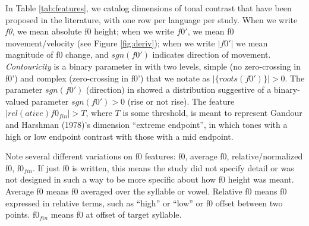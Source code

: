 \documentclass[12pt]{article}
\begin{document}
In Table \ref{tab:features}, we catalog dimensions of tonal contrast
that have been proposed in the literature, with one row per
language per study. When we write
\textit{f0}, we mean absolute f0 height; when we write $f0'$,
we mean f0 movement/velocity (see Figure \ref{fig:deriv}); when we write \textit{$|f0'|$} we mean magnitude
of f0 change, and \textit{$sgn(f0')$} indicates direction of
movement. \textit{Contouricity} is a binary parameter in
\citet{Brunelle:2009} with two levels, simple (no zero-crossing in
f0') and complex (zero-crossing in f0') that we notate as
$|\{roots(f0')\}| > 0$. The parameter $sgn(f0')$ (direction) in
\citep{Gandour:1983,Gandour:1978a} showed a distribution 
suggestive of a binary-valued parameter $sgn(f0')>0$ (rise or not
rise). The feature $|rel(ative) f0_{fin}| > T$, where $T$ is some
threshold, is meant to represent Gandour and Harshman (1978)'s 
dimension ``extreme endpoint'', in which tones with a high
or low endpoint contrast with those with a mid endpoint. 

Note several different variations on f0
features: f0, average f0, relative/normalized f0, f0$_{fin}$. If just f0 is
written, this means the study did not specify detail or was not
designed in such a way to be more specific about how f0 height was
meant. Average f0 means f0 averaged over the syllable or
vowel. Relative f0 means f0 expressed in relative terms, such as
``high'' or ``low'' or f0 offset between two points. f0$_{fin}$ means
f0 at offset of target syllable.
\end{document}
